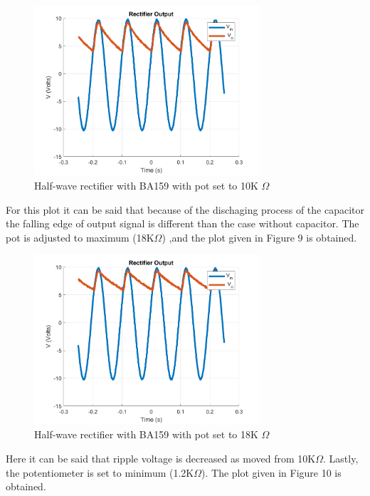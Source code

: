 \documentclass[letterpaper,12pt]{article}
\begin{document}
\begin{figure}[H]
    \centering
    \includegraphics[width = 0.75\textwidth]{2_b_POT_10K.png}
    \caption{Half-wave rectifier with BA159 with pot set to 10K \(\Omega\)}
\end{figure} 
For this plot it can be said that because of the dischaging process of the capacitor the falling edge of output signal is different than the case without capacitor. 
The pot is adjusted to maximum (18K\(\Omega\)) ,and the plot given in Figure 9 is obtained.
\begin{figure}[H]
    \centering
    \includegraphics[width = 0.75\textwidth]{2_b_POT_18K.png}
    \caption{Half-wave rectifier with BA159 with pot set to 18K \(\Omega\)}
\end{figure} 
Here it can be said that ripple voltage is decreased as moved from 10K\(\Omega\).
Lastly, the potentiometer is set to minimum (1.2K\(\Omega\)). The plot given in Figure 10 is obtained. 
\end{document}
